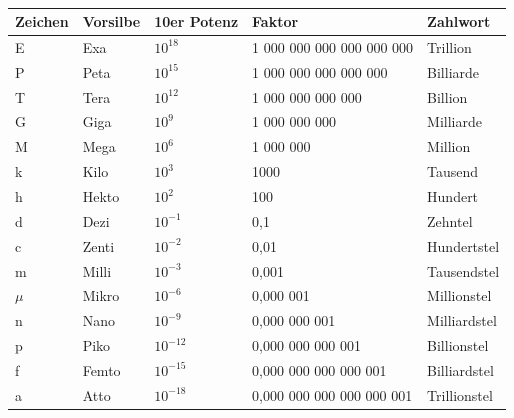 \documentclass[a4paper]{article}
\begin{document}
\vspace{0.5 cm}

\\
\renewcommand{\arraystretch}{2}
\begin{tabular}{|p{2 cm}|p{2 cm}|p{2 cm}|p{4.5 cm}|p{4.5 cm}|}
	\hline
	Zeichen & Vorsilbe & 10er Potenz & Faktor & Zahlwort\\
	\hline
	E & Exa  & $10^{18}$ &   1 000 000 000 000 000 000 & Trillion\\
	\hline
	P & Peta & $10^{15}$  & 1 000 000 000 000 000 & Billiarde \\
	\hline
	T & Tera & $10^{12}$ &  1 000 000 000 000 & Billion\\
	\hline
	G & Giga & $10^9$ & 1 000 000 000  &  Milliarde \\
	\hline
	M & Mega & $10^6$ &   1 000 000  & Million \\
	\hline
	k & Kilo & $10^3$ &   1000 & Tausend \\
	\hline
	h & Hekto & $10^2$ & 100  & Hundert \\
	\hline
	d & Dezi & $10^{-1}$ & 0,1 & Zehntel \\
	\hline
	c & Zenti & $10^{-2}$ & 0,01 & Hundertstel\\
	\hline  
	m & Milli     & $10^{-3}$ & 0,001& Tausendstel\\ 
	\hline
	$\mu$ & Mikro & $10^{-6}$  & 0,000 001 & Millionstel\\
	\hline
	n & Nano & $10^{-9}$ & 0,000 000 001 & Milliardstel\\
	\hline
	p & Piko & $10^{-12}$  & 0,000 000 000 001 & Billionstel\\
	\hline
	f & Femto & $10^{-15}$& 0,000 000 000 000 001  & Billiardstel\\
	\hline
	a & Atto & $10^{-18}$ & 0,000 000 000 000 000 001 & Trillionstel\\
	\hline
\end{tabular}
\vspace{0.5 cm}
\end{document}
